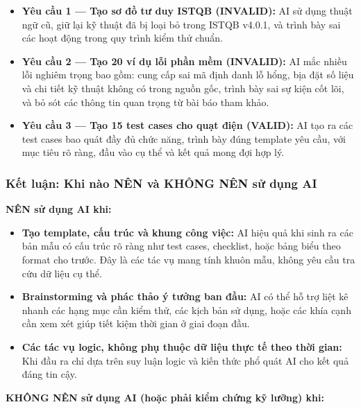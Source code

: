 \vspace{0.3cm}

\begin{itemize}
    \item \textbf{Yêu cầu 1 — Tạo sơ đồ tư duy ISTQB (INVALID):} AI sử dụng thuật ngữ cũ, giữ lại kỹ thuật đã bị loại bỏ trong ISTQB v4.0.1, và trình bày sai các hoạt động trong quy trình kiểm thử chuẩn.
    \item \textbf{Yêu cầu 2 — Tạo 20 ví dụ lỗi phần mềm (INVALID):} AI mắc nhiều lỗi nghiêm trọng bao gồm: cung cấp sai mã định danh lỗ hổng, bịa đặt số liệu và chi tiết kỹ thuật không có trong nguồn gốc, trình bày sai sự kiện cốt lõi, và bỏ sót các thông tin quan trọng từ bài báo tham khảo.
    \item \textbf{Yêu cầu 3 — Tạo 15 test cases cho quạt điện (VALID):} AI tạo ra các test cases bao quát đầy đủ chức năng, trình bày đúng template yêu cầu, với mục tiêu rõ ràng, đầu vào cụ thể và kết quả mong đợi hợp lý.
\end{itemize}

\subsubsection{Kết luận: Khi nào NÊN và KHÔNG NÊN sử dụng AI}

\textbf{NÊN sử dụng AI khi:}

\begin{itemize}
    \item \textbf{Tạo template, cấu trúc và khung công việc:} AI hiệu quả khi sinh ra các bản mẫu có cấu trúc rõ ràng như test cases, checklist, hoặc bảng biểu theo format cho trước. Đây là các tác vụ mang tính khuôn mẫu, không yêu cầu tra cứu dữ liệu cụ thể.
    \item \textbf{Brainstorming và phác thảo ý tưởng ban đầu:} AI có thể hỗ trợ liệt kê nhanh các hạng mục cần kiểm thử, các kịch bản sử dụng, hoặc các khía cạnh cần xem xét giúp tiết kiệm thời gian ở giai đoạn đầu.
    \item \textbf{Các tác vụ logic, không phụ thuộc dữ liệu thực tế theo thời gian:} Khi đầu ra chỉ dựa trên suy luận logic và kiến thức phổ quát AI cho kết quả đáng tin cậy.
\end{itemize}

\vspace{0.3cm}

\textbf{KHÔNG NÊN sử dụng AI (hoặc phải kiểm chứng kỹ lưỡng) khi:}

